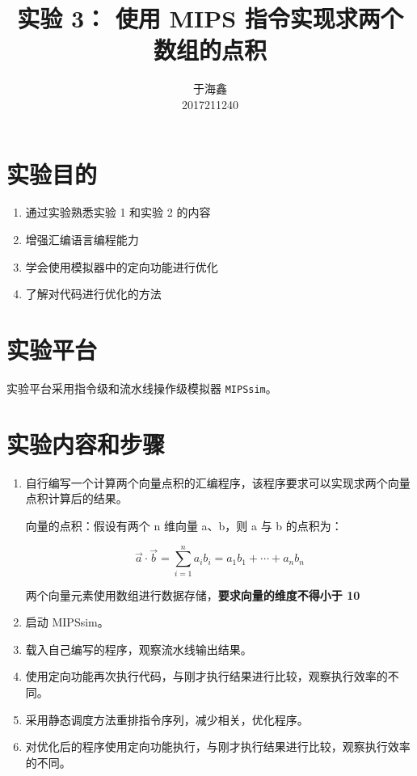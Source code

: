 \documentclass[blue,normal,cn]{elegantnote}
\title{实验 3： 使用 MIPS 指令实现求两个数组的点积}
\date{\zhtoday}
\newcommand{\code}[1]{\colorbox{light-gray}{\texttt{#1}}}
\begin{document}
\author{
    \begin{tabular}[t]{c}
        于海鑫 \\
        2017211240
    \end{tabular}
}
\maketitle

\section{实验目的}
\begin{enumerate}
    \item 通过实验熟悉实验 1 和实验 2 的内容
    \item 增强汇编语言编程能力
    \item 学会使用模拟器中的定向功能进行优化
    \item 了解对代码进行优化的方法
\end{enumerate}

\section{实验平台}

实验平台采用指令级和流水线操作级模拟器 \code{MIPSsim}。

\section{实验内容和步骤}

\begin{enumerate}[wide=0pt, listparindent=2em, parsep=0pt]
    \item 自行编写一个计算两个向量点积的汇编程序，该程序要求可以实现求两个向量点积计算后的结果。

          向量的点积：假设有两个 n 维向量 a、b，则 a 与 b 的点积为：

          $$\vec{a}\cdot\vec{b} = \sum_{i=1}^{n} a_i b_i = a_1b_1 + \cdots + a_nb_n$$

          两个向量元素使用数组进行数据存储，\textbf{要求向量的维度不得小于 10}

    \item 启动 MIPSsim。
    \item 载入自己编写的程序，观察流水线输出结果。
    \item 使用定向功能再次执行代码，与刚才执行结果进行比较，观察执行效率的不同。
    \item 采用静态调度方法重排指令序列，减少相关，优化程序。
    \item 对优化后的程序使用定向功能执行，与刚才执行结果进行比较，观察执行效率的不同。
\end{enumerate}
\end{document}

